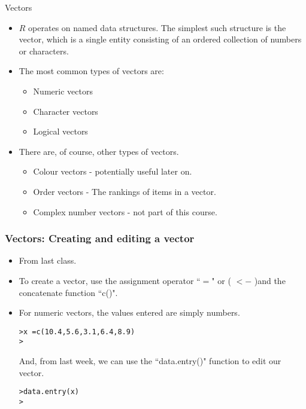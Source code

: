 \documentclass{beamer}
\begin{document}

\begin{frame}[fragile]{Vectors}
\begin{itemize}
\item $R$ operates on named data structures. The simplest such
structure is the vector, which is a single entity consisting of an
ordered collection of numbers or characters.

\item The most common types of vectors are:
\begin{itemize}
\item Numeric vectors \item Character vectors \item Logical
vectors
\end{itemize}

\item There are, of course, other types of vectors.
\begin{itemize}
\item Colour vectors - potentially useful later on.
\item Order vectors - The rankings of items in a vector.
\item Complex number vectors - not part of this course.
\end{itemize}
\end{itemize}
\end{frame}
\begin{frame}[fragile]
\frametitle{Vectors: Creating and editing a vector}
\begin{itemize}
\item From last class.
\item To create a vector, use the assignment operator ``$=$" or ( $<-$ )and
the concatenate function ``c()". \item For numeric vectors, the values
entered are simply numbers.

\begin{verbatim}
>x =c(10.4,5.6,3.1,6.4,8.9)
>
\end{verbatim}

And, from last week, we can use the ``data.entry()" function to edit our vector.
\begin{verbatim}
>data.entry(x)
>
\end{verbatim}
\end{itemize}
\end{frame}
\end{document}

